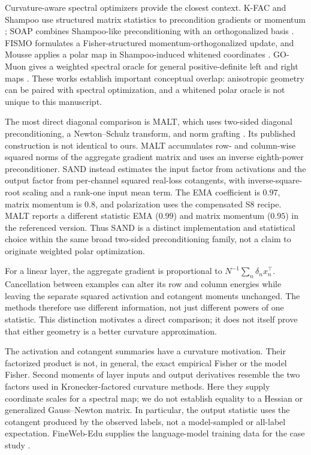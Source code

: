 \documentclass[10pt]{article}
\begin{document}
Curvature-aware spectral optimizers provide the closest context. K-FAC and Shampoo use structured matrix statistics to precondition gradients or momentum \citep{martens2015kfac,gupta2018shampoo}; SOAP combines Shampoo-like preconditioning with an orthogonalized basis \citep{vyas2024soap}. FISMO formulates a Fisher-structured momentum-orthogonalized update, and Mousse applies a polar map in Shampoo-induced whitened coordinates \citep{xu2026fismo,zhang2026mousse}. GO-Muon gives a weighted spectral oracle for general positive-definite left and right maps \citep{che2026gomuon}. These works establish important conceptual overlap: anisotropic geometry can be paired with spectral optimization, and a whitened polar oracle is not unique to this manuscript.

The most direct diagonal comparison is MALT, which uses two-sided diagonal preconditioning, a Newton--Schulz transform, and norm grafting \citep{wu2026malt}. Its published construction is not identical to ours. MALT accumulates row- and column-wise squared norms of the aggregate gradient matrix and uses an inverse eighth-power preconditioner. SAND instead estimates the input factor from activations and the output factor from per-channel squared real-loss cotangents, with inverse-square-root scaling and a rank-one input mean term. The EMA coefficient is $0.97$, matrix momentum is $0.8$, and polarization uses the compensated S8 recipe. MALT reports a different statistic EMA ($0.99$) and matrix momentum ($0.95$) in the referenced version. Thus SAND is a distinct implementation and statistical choice within the same broad two-sided preconditioning family, not a claim to originate weighted polar optimization.

For a linear layer, the aggregate gradient is proportional to $N^{-1}\sum_n\delta_n x_n^\top$. Cancellation between examples can alter its row and column energies while leaving the separate squared activation and cotangent moments unchanged. The methods therefore use different information, not just different powers of one statistic. This distinction motivates a direct comparison; it does not itself prove that either geometry is a better curvature approximation.

The activation and cotangent summaries have a curvature motivation. Their factorized product is not, in general, the exact empirical Fisher or the model Fisher. Second moments of layer inputs and output derivatives resemble the two factors used in Kronecker-factored curvature methods. Here they supply coordinate scales for a spectral map; we do not establish equality to a Hessian or generalized Gauss--Newton matrix. In particular, the output statistic uses the cotangent produced by the observed labels, not a model-sampled or all-label expectation. FineWeb-Edu supplies the language-model training data for the case study \citep{penedo2024fineweb}.
\end{document}
